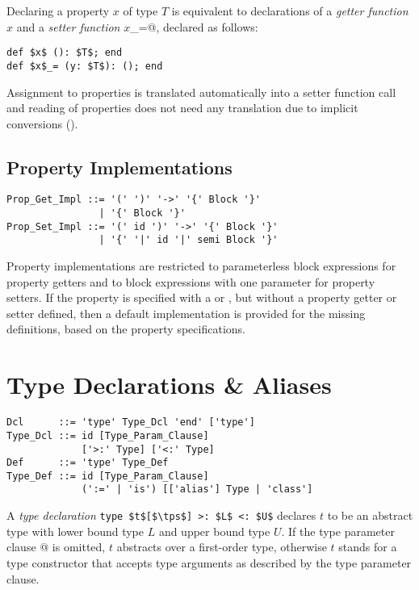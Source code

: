 Declaring a property $x$ of type $T$ is equivalent to declarations of a {\em getter function} $x$ and a {\em setter function} \lstinline@$x$_=@, declared as follows:

\begin{lstlisting}
def $x$ (): $T$; end
def $x$_= (y: $T$): (); end
\end{lstlisting}

Assignment to properties is translated automatically into a setter function call and reading of properties does not need any translation due to implicit conversions (). 






\subsection{Property Implementations}
\label{sec:property-impl}

\begin{lstlisting}
Prop_Get_Impl ::= '(' ')' '->' '{' Block '}'
                | '{' Block '}'
Prop_Set_Impl ::= '(' id ')' '->' '{' Block '}'
                | '{' '|' id '|' semi Block '}'
\end{lstlisting}

Property implementations are restricted to parameterless block expressions for property getters and to block expressions with one parameter for property setters. If the property is specified with a  or , but without a property getter or setter defined, then a default implementation is provided for the missing definitions, based on the property specifications. 





\section{Type Declarations \& Aliases}
\label{sec:type-decls-aliases}

\syntax\begin{lstlisting}
Dcl      ::= 'type' Type_Dcl 'end' ['type']
Type_Dcl ::= id [Type_Param_Clause] 
             ['>:' Type] ['<:' Type]
Def      ::= 'type' Type_Def
Type_Def ::= id [Type_Param_Clause] 
             (':=' | 'is') [['alias'] Type | 'class']
\end{lstlisting}

A {\em type declaration} \lstinline!type $t$[$\tps$] >: $L$ <: $U$! declares $t$ to be an abstract type with lower bound type $L$ and upper bound type $U$. If the type parameter clause \lstinline@[$\tps$]@ is omitted, $t$ abstracts over a first-order type, otherwise $t$ stands for a type constructor that accepts type arguments as described by the type parameter clause. 


